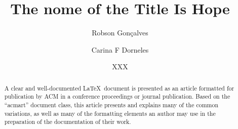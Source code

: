 \documentclass[sigconf]{acmart}
\begin{document}
\title{The nome of the Title Is Hope}

\author{Robson Gonçalves}

\author{Carina F Dorneles}

\author{XXX}

\renewcommand{\shortauthors}{Gonçalves et al.}

\begin{abstract}
  A clear and well-documented \LaTeX\ document is presented as an
  article formatted for publication by ACM in a conference proceedings
  or journal publication. Based on the ``acmart'' document class, this
  article presents and explains many of the common variations, as well
  as many of the formatting elements an author may use in the
  preparation of the documentation of their work.
\end{abstract}


\end{document}
